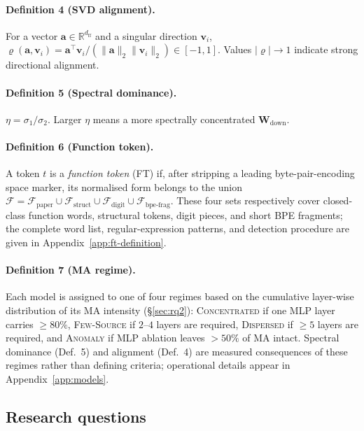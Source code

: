 \documentclass{article}
\newcommand{\Wdown}{\mathbf{W}_{\text{down}}}
\newcommand{\ffd}{d_{\text{ff}}}
\begin{document}
\paragraph{Definition 4 (SVD alignment).}
For a vector $\mathbf{a} \in \mathbb{R}^{\ffd}$ and a singular direction
$\mathbf{v}_i$,
\(
  \varrho(\mathbf{a}, \mathbf{v}_i) = \mathbf{a}^{\top} \mathbf{v}_i / (\|\mathbf{a}\|_2 \|\mathbf{v}_i\|_2) \in [-1,1].
\)
Values $|\varrho| \to 1$ indicate strong directional alignment.

\paragraph{Definition 5 (Spectral dominance).}
$\eta = \sigma_1 / \sigma_2$. Larger $\eta$ means a more spectrally
concentrated $\Wdown$.

\paragraph{Definition 6 (Function token).}
A token $t$ is a \emph{function token} (FT) if, after stripping a leading
byte-pair-encoding space marker, its normalised form belongs to the union
$\mathcal{F} = \mathcal{F}_{\text{paper}} \cup \mathcal{F}_{\text{struct}}
\cup \mathcal{F}_{\text{digit}} \cup \mathcal{F}_{\text{bpe-frag}}$.
These four sets respectively cover closed-class function words, structural
tokens, digit pieces, and short BPE fragments; the complete word list,
regular-expression patterns, and detection procedure are given in
Appendix~\ref{app:ft-definition}.

\paragraph{Definition 7 (MA regime).}
Each model is assigned to one of four regimes based on the cumulative
layer-wise distribution of its MA intensity (\S\ref{sec:rq2}):
\textsc{Concentrated} if one MLP layer carries $\geq\!80\%$,
\textsc{Few-Source} if $2$--$4$ layers are required,
\textsc{Dispersed} if $\geq\!5$ layers are required, and
\textsc{Anomaly} if MLP ablation leaves $>\!50\%$ of MA intact. Spectral
dominance (Def.~5) and alignment (Def.~4) are measured consequences of
these regimes rather than defining criteria; operational details appear in
Appendix~\ref{app:models}.

\subsection{Research questions}
\label{sec:rq-list}
\end{document}
